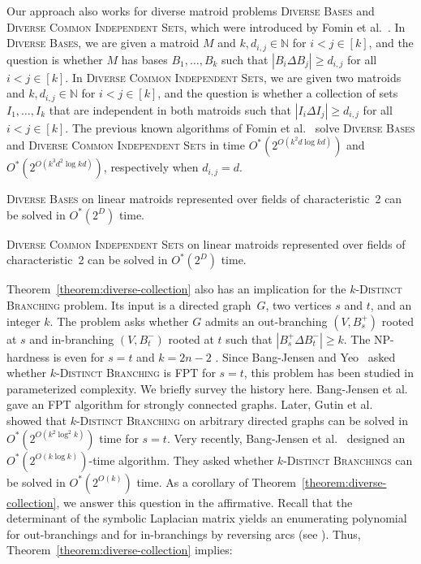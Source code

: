 \documentclass{theoretics}
\newcommand{\N}{\ensuremath{\mathbb N}\xspace}
\begin{document}
Our approach also works for diverse matroid problems \textsc{Diverse Bases} and \textsc{Diverse Common Independent Sets}, which were introduced by Fomin et al.~\cite{FominGPPS24}.
In \textsc{Diverse Bases}, we are given a matroid $M$ and $k, d_{i,j} \in \N$ for $i < j \in [k]$, and the question is whether $M$ has bases $B_1, \dots, B_k$ such that $|B_i \Delta B_j| \ge d_{i, j}$ for all $i < j \in [k]$.
In \textsc{Diverse Common Independent Sets}, we are given two matroids and $k, d_{i,j} \in \N$ for $i < j \in [k]$, and the question is whether a collection of sets $I_1, \dots, I_k$ that are independent in both matroids such that $|I_i \Delta I_j| \ge d_{i,j}$ for all $i < j \in [k]$.
The previous known algorithms of Fomin et al.~\cite{FominGPPS24} solve \textsc{Diverse Bases} and \textsc{Diverse Common Independent Sets} in time $O^*(2^{O(k^2 d \log kd)})$ and $O^*(2^{O(k^3 d^2 \log kd)})$, respectively when $d_{i,j} = d$.

\begin{corollary}
  \textsc{Diverse Bases} on linear matroids represented over fields of characteristic~2 can be solved in $O^*(2^D)$ time.
\end{corollary}
\begin{corollary}
  \textsc{Diverse Common Independent Sets} on linear matroids represented over fields of characteristic~2 can be solved in $O^*(2^D)$ time.
\end{corollary}

Theorem~\ref{theorem:diverse-collection} also has an implication for the \textsc{$k$-Distinct Branching} problem.
Its input is a directed graph~$G$, two vertices $s$ and $t$, and an integer $k$.
The problem asks whether $G$ admits an out-branching $(V, B_s^+)$ rooted at $s$ and in-branching $(V, B_t^-)$ rooted at $t$ such that $|B_s^+ \Delta B_t^-| \ge k$.
The NP-hardness is even for $s = t$ and $k = 2n - 2$ \cite{Bang-Jensen91}.
Since Bang-Jensen and Yeo~\cite{Bang-JensenY08} asked whether \textsc{$k$-Distinct Branching} is FPT for $s = t$, this problem has been studied in parameterized complexity.
We briefly survey the history here.
Bang-Jensen et al.~\cite{Bang-JensenSS16} gave an FPT algorithm for strongly connected graphs.
Later, Gutin et al.~\cite{GutinRW18} showed that \textsc{$k$-Distinct Branching} on arbitrary directed graphs can be solved in $O^*(2^{O(k^2 \log^2 k)})$ time for $s = t$.
Very recently, Bang-Jensen et al.~\cite{Bang-JensenK021} designed an $O^*(2^{O(k \log k)})$-time algorithm.
They asked whether \textsc{$k$-Distinct Branchings} can be solved in $O^*(2^{O(k)})$ time.
As a corollary of Theorem~\ref{theorem:diverse-collection}, we answer this question in the affirmative.
Recall that the determinant of the symbolic Laplacian matrix yields an enumerating polynomial for out-branchings and for in-branchings by reversing arcs (see \cite{BjorklundKK17directed,gessel95algebraic}).
Thus, Theorem~\ref{theorem:diverse-collection} implies:
\end{document}
